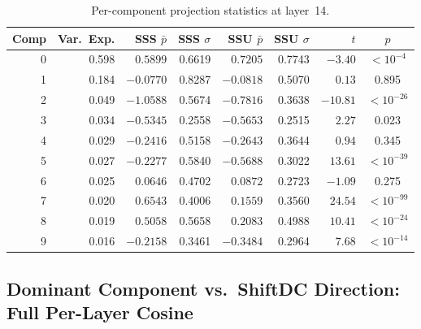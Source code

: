 \documentclass{article}
\begin{document}
\begin{table}[h]
\centering
\caption{Per-component projection statistics at layer~14.}
\label{tab:per_comp_l14}
\small
\begin{tabular}{r r rr rr r c}
\toprule
Comp & Var.\ Exp. & SSS $\bar{p}$ & SSS $\sigma$ & SSU $\bar{p}$ & SSU $\sigma$ & $t$ & $p$ \\
\midrule
0 & 0.598 &  $0.5899$ & 0.6619 &  $0.7205$ & 0.7743 &  $-3.40$ & $<10^{-4}$ \\
1 & 0.184 & $-0.0770$ & 0.8287 & $-0.0818$ & 0.5070 &   $0.13$ & 0.895 \\
2 & 0.049 & $-1.0588$ & 0.5674 & $-0.7816$ & 0.3638 & $-10.81$ & $<10^{-26}$ \\
3 & 0.034 & $-0.5345$ & 0.2558 & $-0.5653$ & 0.2515 &   $2.27$ & 0.023 \\
4 & 0.029 & $-0.2416$ & 0.5158 & $-0.2643$ & 0.3644 &   $0.94$ & 0.345 \\
5 & 0.027 & $-0.2277$ & 0.5840 & $-0.5688$ & 0.3022 &  $13.61$ & $<10^{-39}$ \\
6 & 0.025 &  $0.0646$ & 0.4702 &  $0.0872$ & 0.2723 &  $-1.09$ & 0.275 \\
7 & 0.020 &  $0.6543$ & 0.4006 &  $0.1559$ & 0.3560 &  $24.54$ & $<10^{-99}$ \\
8 & 0.019 &  $0.5058$ & 0.5658 &  $0.2083$ & 0.4988 &  $10.41$ & $<10^{-24}$ \\
9 & 0.016 & $-0.2158$ & 0.3461 & $-0.3484$ & 0.2964 &   $7.68$ & $<10^{-14}$ \\
\bottomrule
\end{tabular}
\end{table}

\subsection{Dominant Component vs.\ ShiftDC Direction: Full Per-Layer Cosine}
\label{app:dom_cosine_full}
\end{document}
